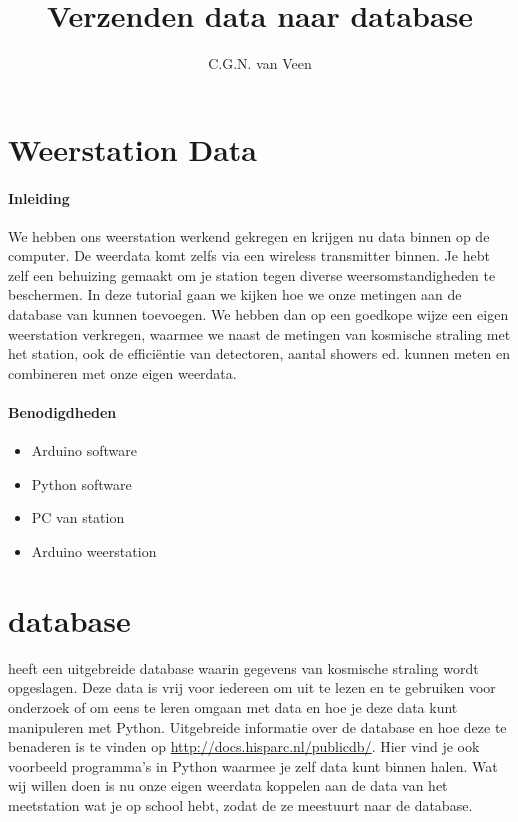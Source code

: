 

\title{Verzenden data naar \hisparc database}
\author{C.G.N. van Veen}



\maketitle

\section{Weerstation Data}

\paragraph{Inleiding} We hebben ons weerstation werkend gekregen en krijgen nu 
data binnen op de computer. De weerdata komt zelfs via een wireless
transmitter binnen. Je hebt zelf een behuizing gemaakt om je station
tegen diverse weersomstandigheden te beschermen. In deze tutorial gaan we kijken
hoe we onze metingen aan de database van \hisparc kunnen toevoegen. 
We hebben dan op een goedkope wijze een eigen weerstation verkregen, waarmee
we naast de metingen van kosmische straling met het \hisparc station, ook de
efficiëntie van detectoren, aantal showers ed. kunnen meten en 
combineren met onze eigen weerdata. 

\paragraph{Benodigdheden}

\begin{itemize}  
    \item Arduino software
    \item Python software
    \item PC van \hisparc station
    \item Arduino weerstation
    
\end{itemize}

\section{\hisparc database}

\hisparc heeft een uitgebreide database waarin gegevens van kosmische straling
wordt opgeslagen. Deze data is vrij voor iedereen om uit te lezen en te gebruiken
voor onderzoek of om eens te leren omgaan met data en hoe je deze data kunt manipuleren met Python.
Uitgebreide informatie over de \hisparc database en hoe deze te benaderen is te 
vinden op \url{http://docs.hisparc.nl/publicdb/}. Hier vind je ook voorbeeld
programma's in Python waarmee je zelf data kunt binnen halen.
Wat wij willen doen is nu onze eigen weerdata koppelen aan de data van het meetstation
wat je op school hebt, zodat de \daq ze meestuurt naar de database.


